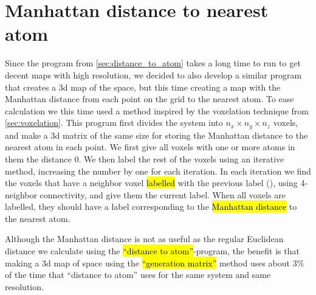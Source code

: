 \section{Manhattan distance to nearest atom\label{sec:generation_matrix}}
Since the program from \cref{sec:distance_to_atom} takes a long time to run to get decent maps with high resolution, we decided to also develop a similar program that creates a 3d map of the space, but this time creating a map with the Manhattan distance from each point on the grid to the nearest atom. To ease calculation we this time used a method inspired by the voxelation technique from \cref{sec:voxelation}. This program first divides the system into $n_x\times n_y\times n_z$ voxels, and make a 3d matrix of the same size for storing the Manhattan distance to the nearest atom in each point. We first give all voxels with one or more atoms in them the distance 0. We then label the rest of the voxels using an iterative method, increasing the number by one for each iteration. In each iteration we find the voxels that have a neighbor voxel \hl{labelled} with the previous label (), using 4-neighbor connectivity, and give them the current label. When all voxels are labelled, they should have a label corresponding to the \hl{Manhattan distance} to the nearest atom.

Although the Manhattan distance is not as useful as the regular Euclidean distance we calculate using the \hl{``distance to atom''}-program, the benefit is that making a 3d map of space using the \hl{``generation matrix''} method uses about 3\% of the time that ``distance to atom'' uses for the same system and same resolution. 



%     
% 
